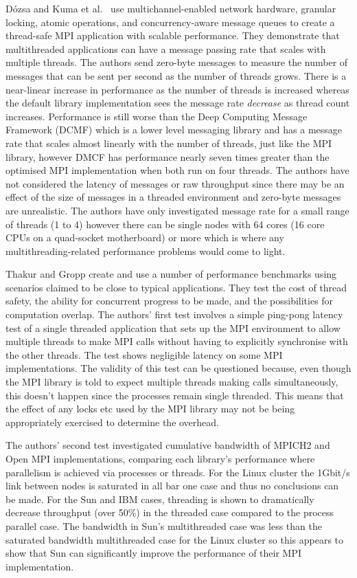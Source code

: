 D\'{o}zsa and Kuma et al.\ \cite{Kumar} use multichannel-enabled network
hardware, granular locking, atomic operations, and concurrency-aware message
queues to create a thread-safe MPI application with scalable performance. They
demonstrate that multithreaded applications can have a message passing rate that
scales with multiple threads. The authors send zero-byte messages to measure the
number of messages that can be sent per second as the number of threads grows.
There is a near-linear increase in performance as the number of threads is
increased whereas the default library implementation sees the message rate
\textit{decrease} as thread count increases. Performance is still worse than the
Deep Computing Message Framework (DCMF) which is a lower level messaging library
and has a message rate that scales almost linearly with the number of threads,
just like the MPI library, however DMCF has performance nearly seven times
greater than the optimised MPI implementation when both run on four threads. The
authors have not considered the latency of messages or raw throughput since
there may be an effect of the size of messages in a threaded environment and
zero-byte messages are unrealistic. The authors have only investigated message
rate for a small range of threads (1 to 4) however there can be single nodes
with 64 cores (16 core CPUs on a quad-socket motherboard) or more which is where
any multithreading-related performance problems would come to light.

Thakur and Gropp \cite{Thakur2009} create and use a number of performance
benchmarks using scenarios claimed to be close to typical applications. They
test the cost of thread safety, the ability for concurrent progress to be made,
and the possibilities for computation overlap. The authors' first test involves
a simple ping-pong latency test of a single threaded application that sets up
the MPI environment to allow multiple threads to make MPI calls without having
to explicitly synchronise with the other threads. The test shows negligible
latency on some MPI implementations. The validity of this test can be questioned
because, even though the MPI library is told to expect multiple threads making
calls simultaneously, this doesn't happen since the processes remain single
threaded. This means that the effect of any locks etc used by the MPI library
may not be being appropriately exercised to determine the overhead.

The authors' second test investigated cumulative bandwidth of MPICH2 and Open
MPI implementations, comparing each library's performance where parallelism is
achieved via processes or threads. For the Linux cluster the 1Gbit/s link
between nodes is saturated in all bar one case and thus no conclusions can be
made. For the Sun and IBM cases, threading is shown to dramatically decrease
throughput (over 50\%) in the threaded case compared to the process parallel
case. The bandwidth in Sun's multithreaded case was less than the saturated
bandwidth multithreaded case for the Linux cluster so this appears to show that
Sun can significantly improve the performance of their MPI implementation.

